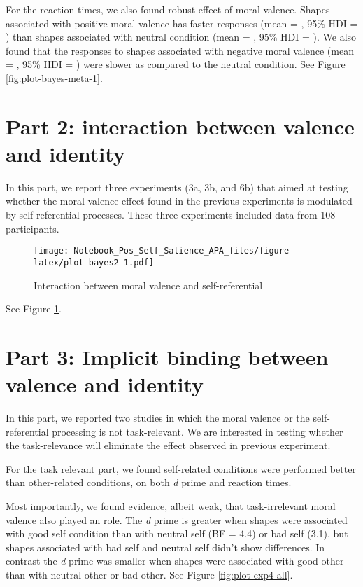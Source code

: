 \documentclass[
  english,
  man]{apa6}
\begin{document}
For the reaction times, we also found robust effect of moral valence. Shapes associated with positive moral valence has faster responses (mean = , 95\% HDI = ) than shapes associated with neutral condition (mean = , 95\% HDI = ). We also found that the responses to shapes associated with negative moral valence (mean = , 95\% HDI = ) were slower as compared to the neutral condition. See Figure \ref{fig:plot-bayes-meta-1}.

\hypertarget{part-2-interaction-between-valence-and-identity}{%
\section{Part 2: interaction between valence and identity}\label{part-2-interaction-between-valence-and-identity}}

In this part, we report three experiments (3a, 3b, and 6b) that aimed at testing whether the moral valence effect found in the previous experiments is modulated by self-referential processes. These three experiments included data from 108 participants.

\begin{figure}
\centering
\texttt{[image: Notebook\_Pos\_Self\_Salience\_APA\_files/figure-latex/plot-bayes2-1.pdf]}
\caption{\label{fig:plot-bayes2}Interaction between moral valence and self-referential}
\end{figure}

See Figure \ref{fig:plot-bayes2}.

\hypertarget{part-3-implicit-binding-between-valence-and-identity}{%
\section{Part 3: Implicit binding between valence and identity}\label{part-3-implicit-binding-between-valence-and-identity}}

In this part, we reported two studies in which the moral valence or the self-referential processing is not task-relevant. We are interested in testing whether the task-relevance will eliminate the effect observed in previous experiment.

For the task relevant part, we found self-related conditions were performed better than other-related conditions, on both \emph{d} prime and reaction times.

Most importantly, we found evidence, albeit weak, that task-irrelevant moral valence also played an role. The \emph{d} prime is greater when shapes were associated with good self condition than with neutral self (BF = 4.4) or bad self (3.1), but shapes associated with bad self and neutral self didn't show differences. In contrast the \emph{d} prime was smaller when shapes were associated with good other than with neutral other or bad other. See Figure \ref{fig:plot-exp4-all}.
\end{document}
